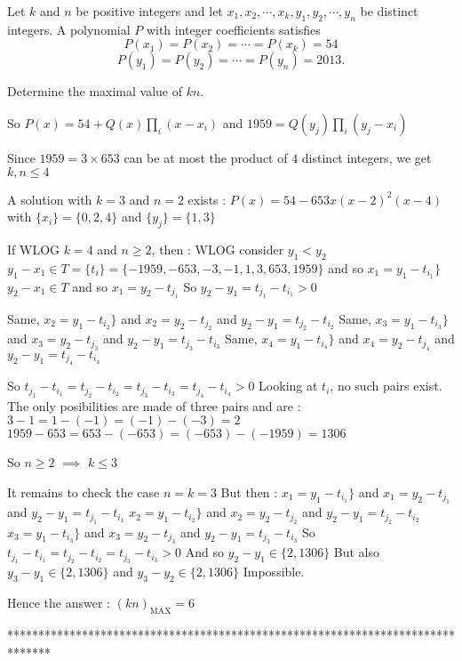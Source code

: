 \begin{solution}
	\begin{tcolorbox}Let $k$ and $n$ be positive integers and let $x_1, x_2, \cdots, x_k, y_1, y_2, \cdots, y_n$ be distinct integers. A polynomial $P$ with integer coefficients satisfies
 \[P(x_1)=P(x_2)= \cdots = P(x_k)=54\] 
\[P(y_1)=P(y_2)= \cdots = P(y_n)=2013.\]

Determine the maximal value of $kn$.\end{tcolorbox}
So $P(x)=54+Q(x)\prod_i(x-x_i)$ and $1959=Q(y_j)\prod_i (y_j-x_i)$

Since $1959=3\times 653$ can be at most the product of $4$ distinct integers, we get $k,n\le 4$

A solution with $k=3$ and $n=2$ exists : $P(x)=54-653x(x-2)^2(x-4)$ with $\{x_i\}=\{0,2,4\}$ and $\{y_j\}=\{1,3\}$

If WLOG $k=4$ and $n\ge 2$, then :
WLOG consider $y_1<y_2$
$y_1-x_1\in T=\{t_i\}=\{-1959,-653,-3,-1,1,3,653,1959\}$ and so $x_1=y_1-t_{i_1}\}$
$y_2-x_1\in T$ and so $x_1=y_2-t_{j_1}$
So $y_2-y_1=t_{j_1}-t_{i_1}>0$

Same, $x_2=y_1-t_{i_2}\}$ and $x_2=y_2-t_{j_2}$ and $y_2-y_1=t_{j_2}-t_{i_2}$
Same, $x_3=y_1-t_{i_3}\}$ and $x_3=y_2-t_{j_3}$ and $y_2-y_1=t_{j_3}-t_{i_3}$
Same, $x_4=y_1-t_{i_4}\}$ and $x_4=y_2-t_{j_4}$ and $y_2-y_1=t_{j_4}-t_{i_4}$

So $t_{j_1}-t_{i_1}=t_{j_2}-t_{i_2}=t_{j_3}-t_{i_3}=t_{j_4}-t_{i_4}>0$
Looking at $t_i$, no such pairs exist. The only posibilities are made of three pairs and are :
$3-1=1-(-1)=(-1)-(-3)=2$
$1959-653=653-(-653)=(-653)-(-1959)=1306$

So $n\ge 2$ $\implies$ $k\le 3$

It remains to check the case $n=k=3$ But then :
$x_1=y_1-t_{i_1}\}$ and $x_1=y_2-t_{j_1}$ and $y_2-y_1=t_{j_1}-t_{i_1}$
$x_2=y_1-t_{i_2}\}$ and $x_2=y_2-t_{j_2}$ and $y_2-y_1=t_{j_2}-t_{i_2}$
$x_3=y_1-t_{i_3}\}$ and $x_3=y_2-t_{j_3}$ and $y_2-y_1=t_{j_3}-t_{i_3}$
So $t_{j_1}-t_{i_1}=t_{j_2}-t_{i_2}=t_{j_3}-t_{i_3}>0$
And so $y_2-y_1\in\{2,1306\}$
But also $y_3-y_1\in\{2,1306\}$ and $y_3-y_2\in\{2,1306\}$
Impossible.

Hence the answer : $\boxed{(kn)_{\text{MAX}}=6}$
\end{solution}
*******************************************************************************
